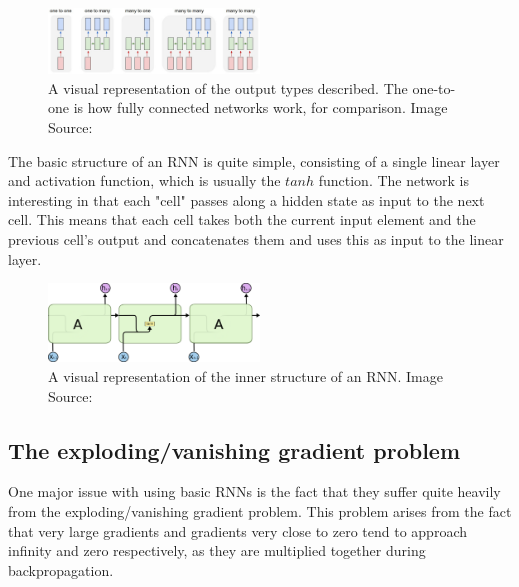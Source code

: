 \begin{figure}[h]
    \centering
        \includegraphics[width=0.5\textwidth]{latex/imgs/rnn_types.png}
    \caption{A visual representation of the output types described. The one-to-one is how fully connected networks work, for comparison. Image Source:\cite{rnn}}
\end{figure}

The basic structure of an RNN is quite simple, consisting of a single linear layer and activation function, which is usually the $tanh$ function. The network is interesting in that each "cell" passes along a hidden state as input to the next cell. This means that each cell takes both the current input element and the previous cell's output and concatenates them and uses this as input to the linear layer.

\begin{figure}[h]
    \centering
        \includegraphics[width=0.5\textwidth]{latex/imgs/rnn.png}
    \caption{A visual representation of the inner structure of an RNN. Image Source:\cite{rnn}}
\end{figure}

\subsection{The exploding/vanishing gradient problem}
One major issue with using basic RNNs is the fact that they suffer quite heavily from the exploding/vanishing gradient problem. This problem arises from the fact that very large gradients and gradients very close to zero tend to approach infinity and zero respectively, as they are multiplied together during backpropagation.

